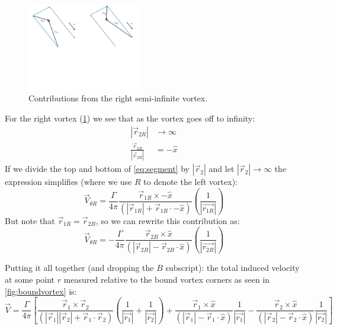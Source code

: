 \documentclass{article}
\begin{document}
\begin{figure}[htbp]
\centering
\includegraphics[width=2in]{figs/rightvortex}
\caption{Contributions from the right semi-infinite vortex.}
\label{fig:rightvortex}
\end{figure}

For the right vortex (\cref{fig:rightvortex}) 
we see that as the vortex goes off to infinity:
\begin{align}
|\vec{r}_{2R}| &\rightarrow \infty\\
\frac{\vec{r}_{2R}}{|\vec{r}_{2R}|} &= -\hat{x}
\end{align}
If we divide the top and bottom of \cref{eq:segment} by $|\vec{r}_2|$ and let $|\vec{r}_2| \rightarrow \infty$ the expression simplifies (where we use $R$ to denote the left vortex):
\begin{equation}
\vec{V}_{\theta R} = \frac{\Gamma}{4 \pi} \frac{\vec{r}_{1R} \times -\hat{x}}{(|\vec{r}_{1R}| + \vec{r}_{1R} \cdot -\hat{x})} \left(\frac{1}{|\vec{r_{1R}}|} \right)
\end{equation}
But note that $\vec{r}_{1R} = \vec{r}_{2B}$, so we can rewrite this contribution as:
\begin{equation}
\vec{V}_{\theta R} = -\frac{\Gamma}{4 \pi} \frac{\vec{r}_{2B} \times \hat{x}}{(|\vec{r}_{2B}| - \vec{r}_{2B} \cdot \hat{x})} \left(\frac{1}{|\vec{r_{2B}}|} \right)
\end{equation}

Putting it all together (and dropping the $B$ subscript): the total induced velocity at some point $r$ measured relative to the bound vortex corners as seen in \cref{fig:boundvortex} is:
\begin{equation}
\vec{V} = 
\frac{\Gamma}{4 \pi} 
\left[
\frac{\vec{r}_{1} \times \vec{r}_{2}}{(|\vec{r}_{1}||\vec{r}_{2}| + \vec{r}_{1} \cdot \vec{r}_{2})} \left(\frac{1}{|\vec{r_{1}}|} + \frac{1}{|\vec{r_{2}}|} \right)
+
\frac{\vec{r}_{1} \times \hat{x}}{(|\vec{r}_{1}| - \vec{r}_{1} \cdot \hat{x})} \frac{1}{|\vec{r_{1}}|} 
-
\frac{\vec{r}_{2} \times \hat{x}}{(|\vec{r}_{2}| - \vec{r}_{2} \cdot \hat{x})} \frac{1}{|\vec{r_{2}}|} 
\right]
\end{equation}
\end{document}
